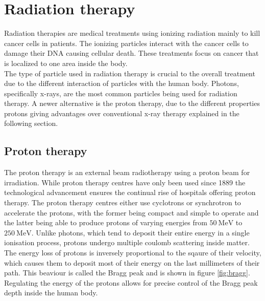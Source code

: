 \chapter{Radiation therapy}
Radiation therapies are medical treatments using ionizing radiation mainly to kill cancer cells in patients. The ionizing particles interact with the
cancer cells to damage their DNA causing cellular death. These treatments focus on cancer that is localized to one area inside the body. \\
The type of particle used in radiation therapy is crucial to the overall treatment due to the different interaction of particles with the human body.
Photons, specifically x-rays, are the most common particles being used for radiation therapy.
A newer alternative is the proton therapy, due to the different properties protons giving advantages over conventional x-ray therapy explained in the following section.

\section{Proton therapy}
The proton therapy is an external beam radiotherapy using a proton beam for irradiation. While proton therapy centres have only been used since 1889 the technological
advancement ensures the continual rise of hospitals offering proton therapy.
The proton therapy centres either use cyclotrons or synchrotron to accelerate the protons, with the former being compact and simple to operate and the latter being able
to produce protons of varying energies from $\SI{50}{\MeV}$ to $\SI{250}{\MeV}$.
Unlike photons, which tend to deposit their entire energy in a single ionisation process, protons undergo multiple coulomb scattering inside matter. The
energy loss of protons is inversely proportional to the sqaure of their velocity, which causes them to deposit most of their energy on the last millimeters of their path.
This beaviour is called the Bragg peak and is shown in figure \ref{fig:bragg}. Regulating the energy of the protons allows for precise control of the Bragg peak depth inside
the human body.

